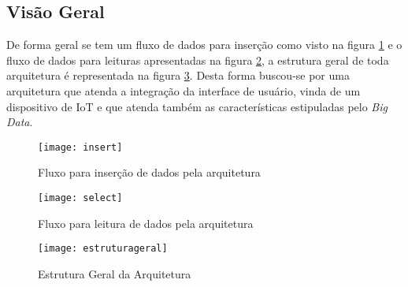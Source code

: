 \subsection{Visão Geral}
De forma geral se tem um fluxo de dados para inserção como visto na figura \ref{fig:insert} e o fluxo de dados para leituras apresentadas na figura \ref{fig:select}, a estrutura geral de toda arquitetura é representada na figura \ref{fig:estruturageral}. Desta forma buscou-se por uma arquitetura que atenda a integração da interface de usuário, vinda de um dispositivo de IoT e que atenda também as características estipuladas pelo \textit{Big Data}. 

\begin{figure}[!h]
\caption{\label{fig:insert} Fluxo para inserção de dados pela arquitetura}
\begin{center}
\texttt{[image: insert]}
\end{center}
\end{figure}

\begin{figure}[!h]
\caption{\label{fig:select} Fluxo para leitura de dados pela arquitetura}
\begin{center}
\texttt{[image: select]}
\end{center}
\end{figure}

\begin{figure}[!h]
\caption{\label{fig:estruturageral} Estrutura Geral da Arquitetura}
\begin{center}
\texttt{[image: estruturageral]}
\end{center}
\end{figure}
